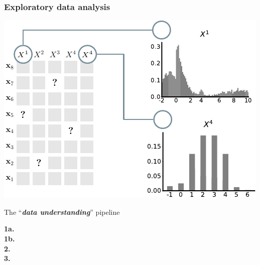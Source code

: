 \documentclass[xcolor={usenames,dvipsnames,svgnames}, compress, aspectratio=169, 11pt]{beamer}
\begin{document}
\begin{frame}[t, htt=bgrey2]
  \frametitle{Exploratory data analysis}
  \large
  \begin{minipage}[t]{0.6\linewidth}
    \vspace{5pt}
    \includegraphics[width=.9\linewidth]{figures/abda-miss-hist-type}
  \end{minipage}\hfill\begin{minipage}[t]{0.4\linewidth}
    \vspace{10pt}
    {The ``\emph{\textbf{data understanding}}'' pipeline}\\[3pt]
    \raggedleft\begin{minipage}[t]{.9\linewidth}
      {\textbf{1a.} \\[-2pt]}
      {\textbf{1b.}\hspace{0pt} \\[-2pt]}
      {\textbf{2.}\hspace{6pt} \\[-2pt]}
      {\textbf{3.}\hspace{6pt} \\[-2pt]}
    \end{minipage}    
  \end{minipage}  
\end{frame}
\end{document}
